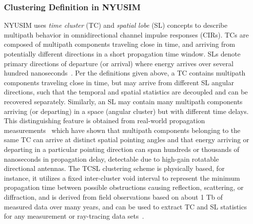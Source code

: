 \documentclass[journal]{IEEEtran}
\begin{document}
\subsubsection{Clustering Definition in NYUSIM}
NYUSIM uses \textit{time cluster} (TC) and \textit{spatial lobe} (SL) concepts to describe multipath behavior in omnidirectional channel impulse responses (CIRs). TCs are composed of multipath components traveling close in time, and arriving from potentially different directions in a short propagation time window. SLs denote primary directions of departure (or arrival) where energy arrives over several hundred nanoseconds~\cite{Samimi15:MTT}. Per the definitions given above, a TC contains multipath components traveling close in time, but may arrive from different SL angular directions, such that the temporal and spatial statistics are decoupled and can be recovered separately. Similarly, an SL may contain many multipath components arriving (or departing) in a space (angular cluster) but with different time delays. This distinguishing feature is obtained from real-world propagation measurements~\cite{Rap13:Access,Rap15:TCOM} which have shown that multipath components belonging to the same TC can arrive at distinct spatial pointing angles and that energy arriving or departing in a particular pointing direction can span hundreds or thousands of nanoseconds in propagation delay, detectable due to high-gain rotatable directional antennas. The TCSL clustering scheme is physically based, for instance,  it utilizes a fixed inter-cluster void interval to represent the minimum propagation time between possible obstructions causing reflection, scattering, or diffraction, and is derived from field observations based on about 1 Tb of measured data over many years, and can be used to extract TC and SL statistics for any measurement or ray-tracing data sets~\cite{Samimi15:MTT}.
\end{document}
